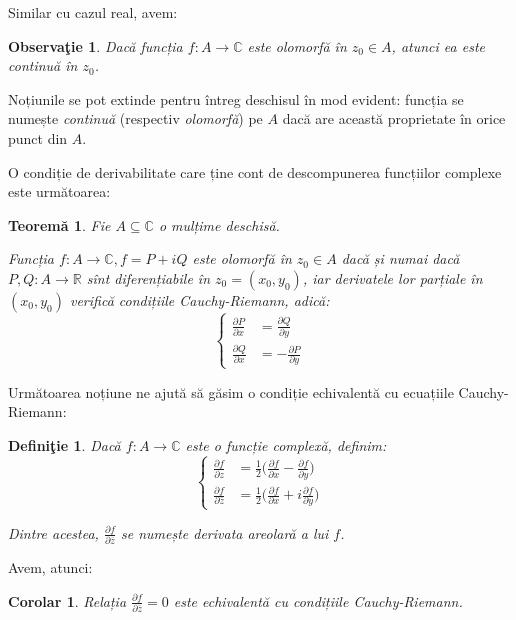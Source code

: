 \documentclass[11pt,a4paper]{article}
\newcommand\seq{\subseteq}
\newcommand\RR{\mathbb{R}}
\newcommand\CC{\mathbb{C}}
\theoremstyle{dotless}
\newtheorem{theorem}{Teorem\u{a}}
\newtheorem{corollary}{Corolar}
\theoremstyle{dotlessdr}
\newtheorem{definition}{Defini\c{t}ie}
\newtheorem{remark}{Observa\c{t}ie}
\begin{document}
Similar cu cazul real, avem:

\begin{remark}\label{rk:ol-cont}
  Dacă funcția $ f : A \to \CC $ este olomorfă în $ z_0 \in A $, atunci ea este
  continuă în $ z_0 $.
\end{remark}

Noțiunile se pot extinde pentru întreg deschisul în mod evident: funcția se numește
\emph{continuă} (respectiv \emph{olomorfă}) pe $ A $ dacă are această proprietate în
orice punct din $ A $.

O condiție de derivabilitate care ține cont de descompunerea funcțiilor complexe
este următoarea:

\begin{theorem}\label{thm:ec-cauchy-riemann}
  Fie $ A \seq \CC $ o mulțime deschisă.

  Funcția $ f : A \to \CC, f = P + iQ $ este olomorfă în $ z_0 \in A $ dacă și numai
  dacă $ P, Q : A \to \RR $ sînt diferențiabile în $ z_0 = (x_0, y_0) $, iar derivatele
  lor parțiale în $ (x_0, y_0) $ verifică \emph{condițiile Cauchy-Riemann}, adică:
  \[
    \begin{cases}
      \frac{\partial P}{\partial x} &= \frac{\partial Q}{\partial y} \\
      \frac{\partial Q}{\partial x} &= -\frac{\partial P}{\partial y}
    \end{cases}
  \]
\end{theorem}

Următoarea noțiune ne ajută să găsim o condiție echivalentă cu ecuațiile
Cauchy-Riemann:

\begin{definition}\label{def:der-areolara}
  Dacă $ f : A \to \CC $ este o funcție complexă, definim:
  \[
    \begin{cases}
      \frac{\partial f}{\partial z} &= \frac{1}{2} \Big(\frac{\partial f}{\partial x} - %
      \frac{\partial f}{\partial y} \Big) \\
      \frac{\partial f}{\partial \overline{z}} &= \frac{1}{2}\Big( %
      \frac{\partial f}{\partial x} + i\frac{\partial f}{\partial y} \Big)
    \end{cases}
  \]

  Dintre acestea, $ \frac{\partial f}{\partial \overline{z}} $ se numește
  \emph{derivata areolară} a lui $ f $.
\end{definition}

Avem, atunci:

\begin{corollary}\label{cor:are-c-r}
  Relația $ \frac{\partial f}{\partial \overline{z}} = 0 $ este echivalentă cu
  condițiile Cauchy-Riemann.
\end{corollary}
\end{document}
